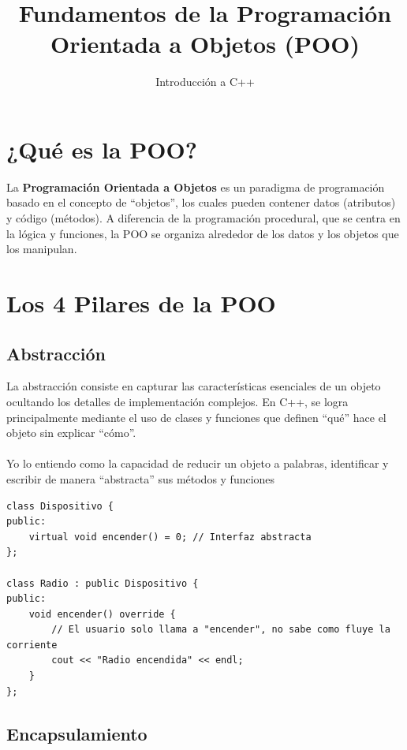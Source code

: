 \documentclass{article}
\title{Fundamentos de la Programación Orientada a Objetos (POO)}
\author{Introducción a C++}
\date{}
\begin{document}
\maketitle

\section{¿Qué es la POO?}

    La \textbf{Programación Orientada a Objetos} es un paradigma de
    programación basado en el concepto de ``objetos'', los cuales pueden
    contener datos (atributos) y código (métodos). A diferencia de la
    programación procedural, que se centra en la lógica y funciones,
    la POO se organiza alrededor de los datos y los objetos que los
    manipulan.

\section{Los 4 Pilares de la POO}

\subsection{Abstracción}

    La abstracción consiste en capturar las características esenciales
    de un objeto ocultando los detalles de implementación complejos. En
    C++, se logra principalmente mediante el uso de clases y funciones
    que definen ``qué'' hace el objeto sin explicar ``cómo''.
    \\
    \\
    Yo lo entiendo como la capacidad de reducir un objeto a palabras, 
    identificar y escribir de manera ``abstracta'' sus métodos y funciones

    \begin{lstlisting}[caption=Ejemplo de Abstracción]
class Dispositivo {
public:
    virtual void encender() = 0; // Interfaz abstracta
};

class Radio : public Dispositivo {
public:
    void encender() override {
        // El usuario solo llama a "encender", no sabe como fluye la corriente
        cout << "Radio encendida" << endl;
    }
};
    \end{lstlisting}

\subsection{Encapsulamiento}
\end{document}
